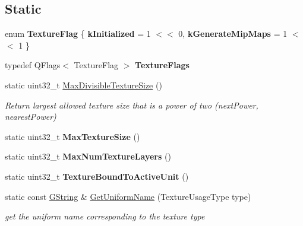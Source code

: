 \subsection*{Static}
\begin{DoxyCompactItemize}
\item 
\mbox{\label{classrev_1_1_texture_aca1dbcaf3ade59266947732593baa1ae}} 
enum {\bfseries Texture\+Flag} \{ {\bfseries k\+Initialized} = 1 $<$$<$ 0, 
{\bfseries k\+Generate\+Mip\+Maps} = 1 $<$$<$ 1
 \}
\item 
\mbox{\label{classrev_1_1_texture_a327b4b13b36bd082998acf19f6d930ed}} 
typedef Q\+Flags$<$ Texture\+Flag $>$ {\bfseries Texture\+Flags}
\item 
\mbox{\label{classrev_1_1_texture_a8c9f59f11b079b2b6bdeec781a99f351}} 
static uint32\+\_\+t \mbox{\hyperlink{classrev_1_1_texture_a8c9f59f11b079b2b6bdeec781a99f351}{Max\+Divisible\+Texture\+Size}} ()
\begin{DoxyCompactList}\small\item\em Return largest allowed texture size that is a power of two (next\+Power, nearest\+Power) \end{DoxyCompactList}\item 
\mbox{\label{classrev_1_1_texture_af0952d3c1b80b22cf5bb2b6886ee79b8}} 
static uint32\+\_\+t {\bfseries Max\+Texture\+Size} ()
\item 
\mbox{\label{classrev_1_1_texture_ad8f110db956706bf01da753e3331588e}} 
static uint32\+\_\+t {\bfseries Max\+Num\+Texture\+Layers} ()
\item 
\mbox{\label{classrev_1_1_texture_addee180ac1d24ad0d50591ed982ca932}} 
static uint32\+\_\+t {\bfseries Texture\+Bound\+To\+Active\+Unit} ()
\item 
\mbox{\label{classrev_1_1_texture_af74ebcf4c80037057e442bf113d82bd8}} 
static const \mbox{\hyperlink{classrev_1_1_g_string}{G\+String}} \& \mbox{\hyperlink{classrev_1_1_texture_af74ebcf4c80037057e442bf113d82bd8}{Get\+Uniform\+Name}} (Texture\+Usage\+Type type)
\begin{DoxyCompactList}\small\item\em get the uniform name corresponding to the texture type \end{DoxyCompactList}\item 

\end{DoxyCompactItemize}
